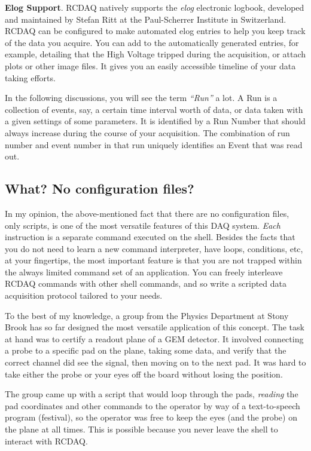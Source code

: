 \documentclass{article}[11pt]
\begin{document}
\begin{description}
\item {\bf Elog Support}. RCDAQ natively supports the \emph{elog}
  electronic logbook, developed and maintained by Stefan Ritt at the
  Paul-Scherrer Institute in Switzerland. RCDAQ can be configured to
  make automated elog entries to help you keep track of the data you
  acquire.  You can add to the automatically generated entries, for
  example, detailing that the High Voltage tripped during the
  acquisition, or attach plots or other image files. It gives you an
  easily accessible timeline of your data taking efforts. 

\end{description}

In the following discussions, you will see the term \emph{``Run''} a
lot. A Run is a collection of events, say, a certain time interval
worth of data, or data taken with a given settings of some
parameters. It is identified by a Run Number that should always
increase during the course of your acquisition. The combination of run
number and event number in that run uniquely identifies an Event that
was read out.

\subsection{What? No configuration files?}
In my opinion, the above-mentioned fact that there are no
configuration files, only scripts, is one of the most versatile
features of this DAQ system. \emph{Each} instruction is a separate command
executed on the shell. Besides the facts that you do not need to learn
a new command interpreter, have loops, conditions, etc, at your
fingertips, the most important feature is that you are not trapped
within the always limited command set of an application. You can freely 
interleave RCDAQ commands with other shell commands, and so write 
a scripted data acquisition protocol tailored to your needs.

To the best of my knowledge, a group from the Physics Department at
Stony Brook has so far designed the most versatile application of this
concept. The task at hand was to certify a readout plane of a GEM
detector. It involved connecting a probe to a specific pad on the
plane, taking some data, and verify that the correct channel did see the
signal, then moving on to the next pad. It was hard to take either the
probe or your eyes off the board without losing the position.

The group came up with a script that would loop through the pads,
\emph{reading} the pad coordinates and other commands to the operator
by way of a text-to-speech program (festival), so the operator was
free to keep the eyes (and the probe) on the plane at all times. This
is possible because you never leave the shell to interact with RCDAQ. 
\end{document}
